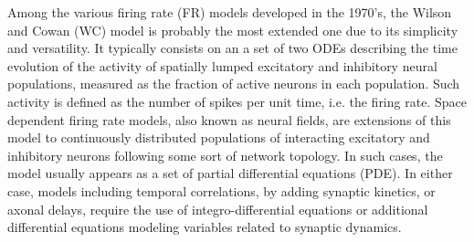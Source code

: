 Among the various firing rate (FR) models developed in the 1970's,
the Wilson and Cowan (WC) model is probably the most extended one due to its
simplicity and versatility. It typically consists on an a set of two
ODEs describing the time evolution of the activity of spatially lumped excitatory and
inhibitory neural populations, measured as the fraction of active neurons in each
population. Such activity is defined as
the number of spikes per unit time, i.e. the firing rate.
Space dependent firing rate models, also known as neural fields, are
extensions of this model to continuously distributed populations of
interacting excitatory and inhibitory neurons following some sort of
network topology. In such cases, the 
model usually appears as a set of partial differential
equations (PDE). In either case, models including temporal correlations, by
adding synaptic kinetics, or axonal delays, require the use of
integro-differential equations or additional differential equations
modeling variables related to synaptic dynamics.



